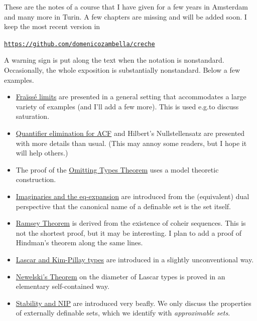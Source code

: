 \documentclass[creche.tex]{subfiles}
\begin{document}
These are the notes of a course that I have given for a few years in Amsterdam and many more in Turin. A few chapters are missing and will be added soon. I keep the most recent version in 

\hfil\href{https://github.com/domenicozambella/creche}{\tt https://github.com/domenicozambella/creche}


\noindent\llap{\textcolor{red}{\Large\danger}\kern1.5ex}A warning sign is put along the text when the notation is nonstandard. Occasionally, the whole exposition is substantially nonstandard.
Below a few examples.



\begin{itemize}
\item \hyperref[rich]{Fraïssé limits} are presented in a general setting that accommodates a large variety of examples (and I'll add a few more). This is used e.g.\@ to discuss saturation.
\item \hyperref[algebraic]{Quantifier elimination for ACF} and Hilbert's Nullstellensatz are presented with more details than usual. (This may annoy some readers, but I hope it will help others.)
\item The proof of the \hyperref[countable]{Omitting Types Theorem} uses a model theoretic construction.
\item \hyperref[imaginary]{Imaginaries and the eq-expansion} are introduced from the (equivalent) dual perspective that the canonical name of a definable set is the set itself.
\item \hyperref[Ramsey]{Ramsey Theorem} is derived from the existence of coheir sequences. This is not the shortest proof, but it may be interesting. I plan to add a proof of Hindman's theorem along the same lines.
\item \hyperref[invariantL]{Lascar and Kim-Pillay types} are introduced in a slightly unconventional way. %
\item \hyperref[newelski]{Newelski's Theorem\/} on the diameter of Lascar types is proved in an elementary self-contained way.
\item  \hyperref[external]{Stability and NIP\/} are introduced very beafly. We only discuss the properties of externally definable sets, which we identify with \textit{approximable sets}.
\end{itemize}
\end{document}
